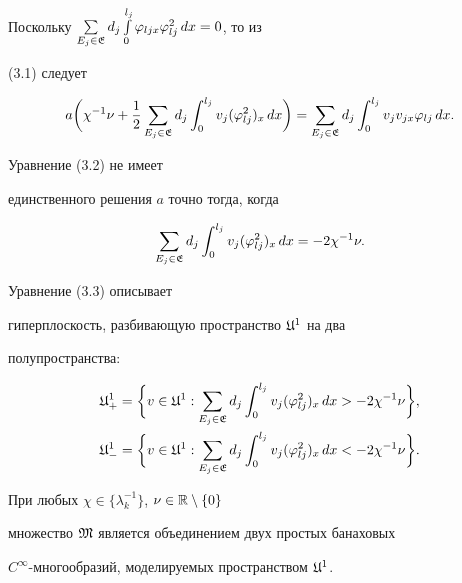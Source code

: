 Поскольку $\sum\limits_{E_j \in \frak{E}}^{}d_j


\int\limits_0^{l_j} \varphi_{ljx} \varphi^2_{lj} \,dx=0$, то из


(3.1) следует


\begin{equation}


a \bigg(\chi^{-1} \nu+\frac{1}{2} \sum_{E_j \in


\frak{E}}d_j \int_0^{l_j} v_j (\varphi^2_{lj})_x \,dx\bigg)=


\sum_{E_j \in \frak{E}}d_j \int_0^{l_j}v_j v_{jx}


\varphi_{lj} \,dx.


\end{equation}


Уравнение (3.2) не имеет


единственного решения $a$ точно тогда, когда


\begin{equation}


\sum_{E_j \in


\frak{E}}d_j \int_0^{l_j} v_j (\varphi^2_{lj})_x


\,dx=-2 \chi^{-1} \nu.


\end{equation}


Уравнение (3.3) описывает


гиперплоскость, разбивающую пространство $\frak{U}^1$ на два


полупространства:


\begin{gather*}


\frak{U}^1_+=\bigg\{v \in \frak{U}^1:


\sum_{E_j \in \frak{E}}d_j \int_0^{l_j} v_j


(\varphi^2_{lj})_x \,dx>-2 \chi^{-1} \nu \bigg\},\\


\frak{U}^1_-=\bigg\{v \in \frak{U}^1: \sum_{E_j \in


\frak{E}}d_j \int_0^{l_j} v_j (\varphi^2_{lj})_x


\,dx<-2 \chi^{-1} \nu \bigg\}.


\end{gather*}








\begin{lems}


При любых $\chi \in \{\lambda_k^{-1}\}$, $\nu \in \Bbb{R}\setminus\{0\}$ 


множество $\frak{M}$ является объединением двух простых банаховых


$C^{\infty}$-многообразий, моделируемых пространством $\frak{U}^1$.


\end{lems}








